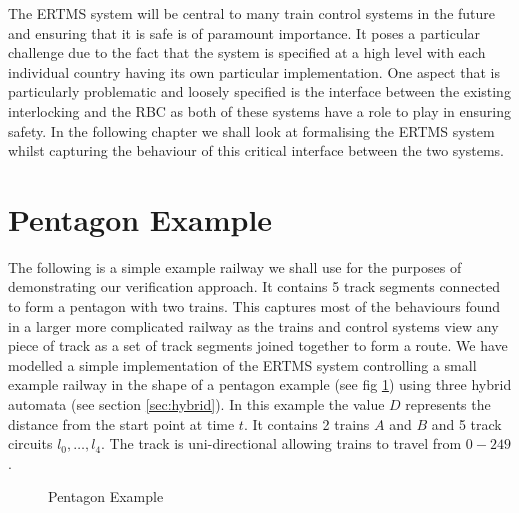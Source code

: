 

\label{chap:hybrid}
The ERTMS system will be central to many train control systems in the future and ensuring that it is safe is of paramount importance. It poses a particular challenge due to the fact that the system is specified at a high level with each individual country having its own particular implementation. One aspect that is particularly problematic and loosely specified is the interface between the existing interlocking and the RBC as both of these systems have a role to play in ensuring safety. In the following chapter we shall look at formalising the ERTMS system whilst capturing the behaviour of this critical interface between the two systems. 

\section{Pentagon Example}

The following is a simple example railway we shall use for the purposes of demonstrating our verification approach.  It contains 5 track segments connected to form a pentagon with two trains. This captures most of the behaviours found in a larger more complicated railway as the trains and control systems view any piece of track as a set of track segments joined together to form a route. We have modelled  a simple implementation of the ERTMS system controlling  a small example railway in the shape of a pentagon example (see fig \ref{fig:pentagon2}) using three hybrid automata (see section \ref{sec:hybrid}). In this example the value $D$ represents the distance from the start point at time $t$. It contains 2 trains $A$ and $B$ and 5 track circuits $l_0, \ldots , l_4$. The track is uni-directional allowing trains to travel from $0 - 249$. 
\medskip

\begin{figure} [h!]

\begin{center}
\end{center}

 \caption{Pentagon Example}
 \label{fig:pentagon2}
\end{figure}

